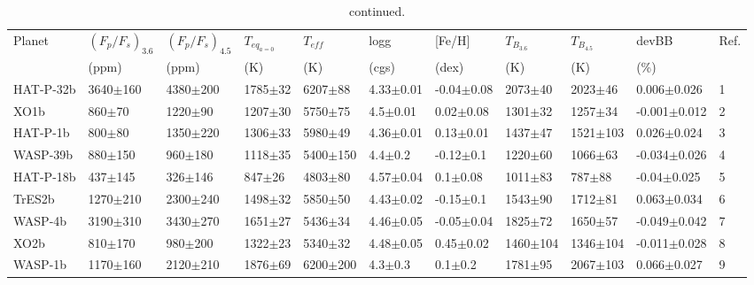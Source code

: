 \begin{subappendices}
{\begin{landscape}
\begin{longtable}{lllllllllll}
\hline
\endfirsthead
\caption{continued.} \\
\hline\hline
Planet & $(F_p/F_s)_{3.6}$ & $(F_p/F_s)_{4.5}$ &     $T_{eq_{a=0}}$ &           $T_{eff}$ &       logg  &           [Fe/H] & $T_{B_{3.6}}$ & $T_{B_{4.5}}$ &       devBB &            Ref.\\
 & (ppm) & (ppm) & (K) & (K) & (cgs) & (dex) & (K) & (K) & (\%) &             \\
\hline
\endhead
\hline
\endfoot
HAT-P-32b     &    3640$\pm$160 &    4380$\pm$200 &   1785$\pm$32 &    6207$\pm$88 &  4.33$\pm$0.01 &  -0.04$\pm$0.08 &        2073$\pm$40 &        2023$\pm$46 &   0.006$\pm$0.026 &           1 \\
XO1b        &      860$\pm$70 &     1220$\pm$90 &   1207$\pm$30 &    5750$\pm$75 &   4.5$\pm$0.01 &   0.02$\pm$0.08 &        1301$\pm$32 &        1257$\pm$34 &  -0.001$\pm$0.012 &       2 \\
HAT-P-1b      &      800$\pm$80 &    1350$\pm$220 &   1306$\pm$33 &    5980$\pm$49 &  4.36$\pm$0.01 &   0.13$\pm$0.01 &        1437$\pm$47 &       1521$\pm$103 &   0.026$\pm$0.024 &        3 \\
WASP-39b     &     880$\pm$150 &     960$\pm$180 &   1118$\pm$35 &   5400$\pm$150 &    4.4$\pm$0.2 &   -0.12$\pm$0.1 &        1220$\pm$60 &        1066$\pm$63 &  -0.034$\pm$0.026 &         4 \\
HAT-P-18b     &     437$\pm$145 &     326$\pm$146 &    847$\pm$26 &    4803$\pm$80 &  4.57$\pm$0.04 &    0.1$\pm$0.08 &        1011$\pm$83 &         787$\pm$88 &   -0.04$\pm$0.025 &  5 \\
TrES2b      &    1270$\pm$210 &    2300$\pm$240 &   1498$\pm$32 &    5850$\pm$50 &  4.43$\pm$0.02 &   -0.15$\pm$0.1 &        1543$\pm$90 &        1712$\pm$81 &   0.063$\pm$0.034 &      6 \\
WASP-4b      &    3190$\pm$310 &    3430$\pm$270 &   1651$\pm$27 &    5436$\pm$34 &  4.46$\pm$0.05 &  -0.05$\pm$0.04 &        1825$\pm$72 &        1650$\pm$57 &  -0.049$\pm$0.042 &         7 \\
XO2b        &     810$\pm$170 &     980$\pm$200 &   1322$\pm$23 &    5340$\pm$32 &  4.48$\pm$0.05 &   0.45$\pm$0.02 &       1460$\pm$104 &       1346$\pm$104 &  -0.011$\pm$0.028 &       8 \\
WASP-1b      &    1170$\pm$160 &    2120$\pm$210 &   1876$\pm$69 &   6200$\pm$200 &    4.3$\pm$0.3 &     0.1$\pm$0.2 &        1781$\pm$95 &       2067$\pm$103 &   0.066$\pm$0.027 &       9 \\

\end{longtable}
\end{landscape}}
\end{subappendices}

